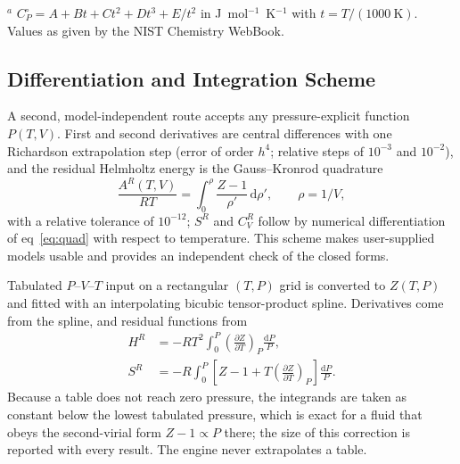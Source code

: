 \documentclass[journal=iecred,manuscript=article,layout=twocolumn]{achemso}
\newcommand{\pd}[3]{\left(\frac{\partial #1}{\partial #2}\right)_{\!#3}}
\newcommand{\Cpo}{C_P^{\circ}}
\begin{document}
\begin{table}
\caption{Fluid Constants and Ideal-Gas Heat Capacity Coefficients Used by the
Engine$^a$}
\label{tab:fluids}
\small
{}

\raggedright\footnotesize $^a$ $\Cpo = A + Bt + Ct^2 + Dt^3 + E/t^2$ in
J~mol$^{-1}$~K$^{-1}$ with $t = T/(1000~\mathrm{K})$. Values as given by the
NIST Chemistry WebBook.\cite{NISTWebBook}
\end{table}

\subsection{Differentiation and Integration Scheme}

A second, model-independent route accepts any pressure-explicit function
$P(T,V)$. First and second derivatives are central differences with one
Richardson extrapolation step (error of order $h^4$; relative steps of
$10^{-3}$ and $10^{-2}$), and the residual Helmholtz energy is the
Gauss--Kronrod quadrature
\begin{equation}
\frac{A^R(T,V)}{RT} = \int_0^{\rho}\frac{Z-1}{\rho'}\,\mathrm{d}\rho',
\qquad \rho = 1/V ,
\label{eq:quad}
\end{equation}
with a relative tolerance of $10^{-12}$; $S^R$ and $C_V^R$ follow by numerical
differentiation of eq~\ref{eq:quad} with respect to temperature. This scheme
makes user-supplied models usable and provides an independent check of the
closed forms.

Tabulated $P$--$V$--$T$ input on a rectangular $(T,P)$ grid is converted to
$Z(T,P)$ and fitted with an interpolating bicubic tensor-product spline.
Derivatives come from the spline, and residual functions from
\begin{align}
H^R &= -RT^2\!\int_0^P\!\pd{Z}{T}{P}\frac{\mathrm{d}P}{P}, \label{eq:HRtab}\\
S^R &= -R\!\int_0^P\!\left[Z-1+T\pd{Z}{T}{P}\right]\frac{\mathrm{d}P}{P}.
\label{eq:SRtab}
\end{align}
Because a table does not reach zero pressure, the integrands are taken as
constant below the lowest tabulated pressure, which is exact for a fluid that
obeys the second-virial form $Z - 1 \propto P$ there; the size of this
correction is reported with every result. The engine never extrapolates a
table.
\end{document}
